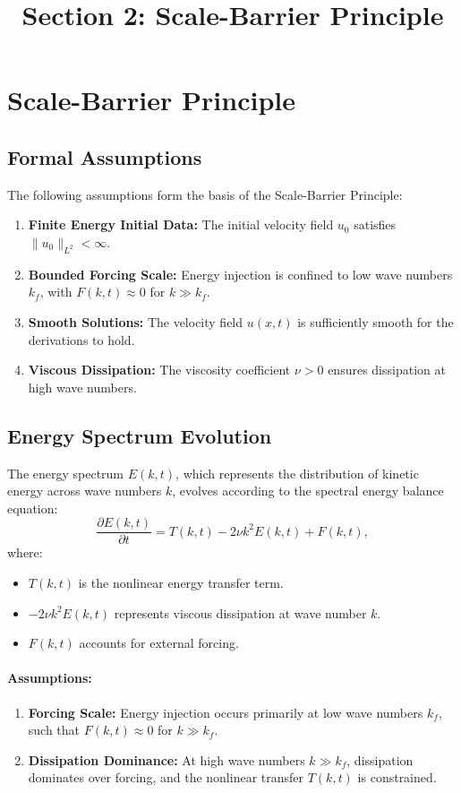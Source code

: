 \documentclass[12pt]{article}
\theoremstyle{definition}
\begin{document}
\title{Section 2: Scale-Barrier Principle}
\author{}
\date{}
\maketitle

\section{Scale-Barrier Principle}

\subsection{Formal Assumptions}
The following assumptions form the basis of the Scale-Barrier Principle:
\begin{enumerate}
    \item \textbf{Finite Energy Initial Data:} The initial velocity field $u_0$ satisfies $\|u_0\|_{L^2} < \infty$.
    \item \textbf{Bounded Forcing Scale:} Energy injection is confined to low wave numbers $k_f$, with $F(k, t) \approx 0$ for $k \gg k_f$.
    \item \textbf{Smooth Solutions:} The velocity field $u(x, t)$ is sufficiently smooth for the derivations to hold.
    \item \textbf{Viscous Dissipation:} The viscosity coefficient $\nu > 0$ ensures dissipation at high wave numbers.
\end{enumerate}

\subsection{Energy Spectrum Evolution}
The energy spectrum $E(k, t)$, which represents the distribution of kinetic energy across wave numbers $k$, evolves according to the spectral energy balance equation:
\[
\frac{\partial E(k, t)}{\partial t} = T(k, t) - 2\nu k^2 E(k, t) + F(k, t),
\]
where:
\begin{itemize}
    \item $T(k, t)$ is the nonlinear energy transfer term.
    \item $-2\nu k^2 E(k, t)$ represents viscous dissipation at wave number $k$.
    \item $F(k, t)$ accounts for external forcing.
\end{itemize}

\paragraph{Assumptions:}
\begin{enumerate}
    \item \textbf{Forcing Scale:} Energy injection occurs primarily at low wave numbers $k_f$, such that $F(k, t) \approx 0$ for $k \gg k_f$.
    \item \textbf{Dissipation Dominance:} At high wave numbers $k \gg k_f$, dissipation dominates over forcing, and the nonlinear transfer $T(k, t)$ is constrained.
\end{enumerate}
\end{document}
